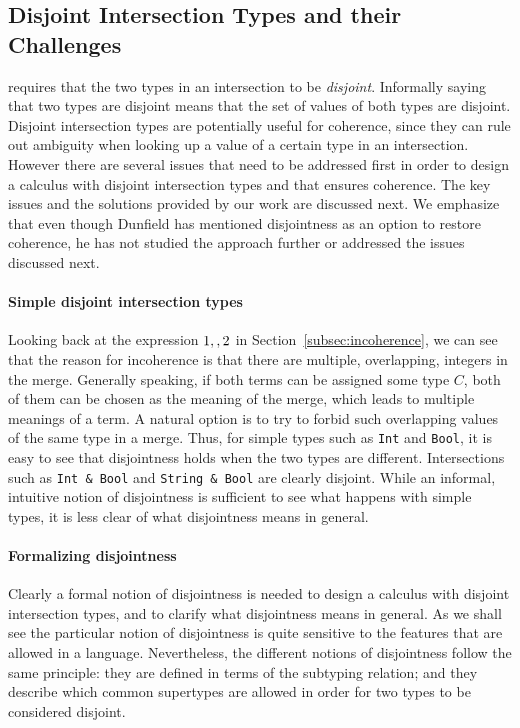 \subsection{Disjoint Intersection Types and their Challenges}\label{subsec:challenges}
\name requires that the
two types in an intersection to be \emph{disjoint}.
Informally saying that two types are disjoint means that the set of
values of both types are disjoint. Disjoint intersection types are
potentially useful for coherence, since they can rule out ambiguity
when looking up a value of a certain type in an intersection. However
there are several issues that need to be addressed first in order to
design a calculus with disjoint intersection types and that ensures
coherence. The key issues and the solutions provided by our work are
discussed next. We emphasize that even though Dunfield
has mentioned disjointness as an option to restore coherence, he
has not studied the approach further or addressed the issues discussed next.

\paragraph{Simple disjoint intersection types}
Looking back at the expression $1 ,, 2$ in
Section~\ref{subsec:incoherence}, we can see that the reason for
incoherence is that there are multiple, overlapping, integers in the
merge. Generally speaking, if both terms can be assigned some type
$C$, both of them can be chosen as the meaning of the merge, which
leads to multiple meanings of a term. A natural option is to try
to forbid such overlapping values of the same type in a merge.
Thus, for simple types such as \lstinline$Int$ and \lstinline$Bool$, it is
easy to see that disjointness holds when the two types are
different. Intersections such as \lstinline$Int & Bool$ and 
\lstinline$String & Bool$ are clearly disjoint.
While an informal, intuitive notion of disjointness is sufficient to
see what happens with simple types, it is less clear of what
disjointness means in general.

\paragraph{Formalizing disjointness} 
Clearly a formal notion of disjointness is needed to design a
calculus with disjoint intersection types, and to clarify what
disjointness means in general.
As we shall see the particular notion of disjointness is quite
sensitive to the features that are allowed in a language.
Nevertheless, the different notions of disjointness follow the same
principle: they are defined in terms of the subtyping relation; 
and they describe which common supertypes are allowed in order for 
two types to be considered disjoint.

